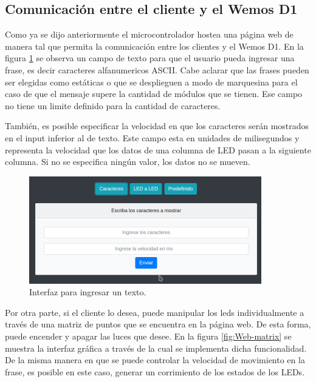     \subsection{Comunicación entre el cliente y el Wemos D1}
    Como ya se dijo anteriormente el microcontrolador hostea una página web de manera tal que permita la comunicación entre los clientes y el Wemos D1. En la figura \ref{fig:Web-text} se observa un campo de texto para que el usuario pueda ingresar una frase, es decir caracteres alfanumericos ASCII. Cabe aclarar que las frases pueden ser elegidas como estáticas o que se desplieguen a modo de marquesina para el caso de que el mensaje supere la cantidad de módulos que se tienen. Ese campo no tiene un limite definido para la cantidad de caracteres.
    
    También, es posible especificar la velocidad en que los caracteres serán mostrados en el input inferior al de texto. Este campo esta en unidades de milisegundos y representa la velocidad que los datos de una columna de LED pasan a la siguiente columna. Si no se especifica ningún valor, los datos no se mueven.

    \begin{figure}[ht!]
    	\centering
    	\begin{center}
    		\includegraphics[width=0.9\textwidth]{imagenes/web/caracteres.png}
    		\caption{Interfaz para ingresar un texto.}
    		\label{fig:Web-text}
    	\end{center}
    \end{figure}
    
    Por otra parte, si el cliente lo desea, puede manipular los leds individualmente a través de una matriz de puntos que se encuentra en la página web. De esta forma, puede encender y apagar las luces que desee. En la figura \ref{fig:Web-matrix} se muestra la interfaz gráfica a través de la cual se implementa dicha funcionalidad. De la misma manera en que se puede controlar la velocidad de movimiento en la frase, es posible en este caso, generar un corrimiento de los estados de los LEDs.

